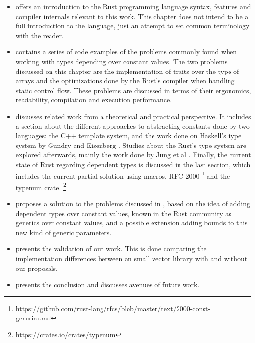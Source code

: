 \begin{itemize}
    \item {} offers an introduction to the Rust
        programming language syntax, features and compiler internals relevant
        to this work. This chapter does not intend to be a full introduction to
        the language, just an attempt to set common terminology with the
        reader.
    \item {} contains a series of code examples of the
        problems commonly found when working with types depending over constant
        values. The two problems discussed on this chapter are the
        implementation of traits over the type of arrays and the optimizations
        done by the Rust's compiler when handling static control flow. These
        problems are discussed in terms of their ergonomics, readability,
        compilation and execution performance.
    \item {} discusses related work from a theoretical
        and practical perspective. It includes a section about the
        different approaches to abstracting constants done by
        two languages: the C++ template system, and the work done on Haskell's type
        system by Gundry \cite{gundry} and Eisenberg \cite{eisenberg}. Studies
        about the Rust's type system are explored afterwards, mainly the work
        done by Jung et al \cite{ralf}. Finally, the current state of Rust
        regarding dependent types is discussed in the last section, which
        includes the current partial solution using macros, RFC-2000
        \footnote{\url{https://github.com/rust-lang/rfcs/blob/master/text/2000-const-generics.md}}
        and the typenum crate.
        \footnote{\url{https://crates.io/crates/typenum}}
    \item {} proposes a solution to the problems discussed in
        , based on the idea of adding dependent types
        over constant values, known in the Rust community as generics over
        constant values, and a possible extension adding bounds to this new
        kind of generic parameters.

    \item {} presents the validation of our work. This is done
        comparing the implementation differences between an small vector
        library with and without our proposals.

    \item {} presents the conclusion and discusses avenues of future
        work.
\end{itemize}
